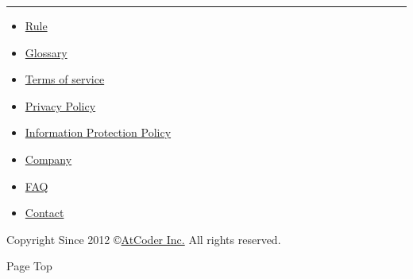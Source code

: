 {} {} {} \href{https://www.addtoany.com/share}{}

\begin{center}\rule{0.5\linewidth}{\linethickness}\end{center}

\begin{itemize}
\tightlist
\item
  \href{/contests/abc153/rules}{Rule}
\item
  \href{/contests/abc153/glossary}{Glossary}
\end{itemize}

\begin{itemize}
\tightlist
\item
  \href{/tos}{Terms of service}
\item
  \href{/privacy}{Privacy Policy}
\item
  \href{/personal}{Information Protection Policy}
\item
  \href{/company}{Company}
\item
  \href{/faq}{FAQ}
\item
  \href{/contact}{Contact}
\end{itemize}

{Copyright Since 2012 ©\href{http://atcoder.co.jp}{AtCoder Inc.} All
rights reserved.}

Page Top
